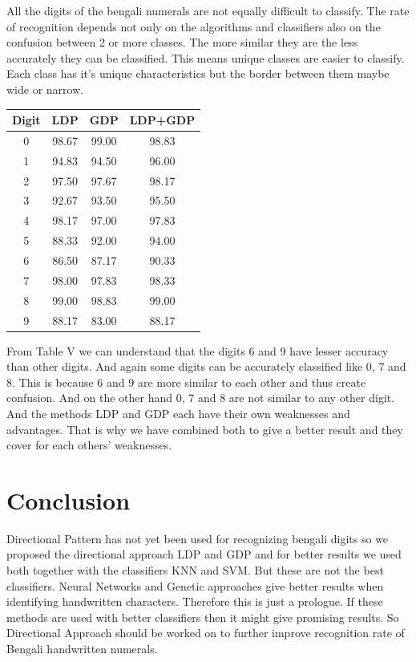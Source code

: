 \documentclass[conference]{IEEEtran}
\begin{document}
All the digits of the bengali numerals are not equally difficult to classify. The rate of recognition depends not only on the algorithms and classifiers also on the confusion between 2 or more classes. The more similar they are the less accurately they can be classified. This means unique classes are easier to classify. Each class has it's unique characteristics but the border between them maybe wide or narrow.
\begin{center}
	\begin{tabular}{cccc}
		\hline
		Digit & LDP & GDP & LDP+GDP \\
		\hline
		0 & 98.67 & 99.00 & 98.83\\
		1 & 94.83 & 94.50 & 96.00\\
		2 & 97.50 & 97.67 & 98.17\\
		3 & 92.67 & 93.50 & 95.50\\
		4 & 98.17 & 97.00 & 97.83\\
		5 & 88.33 & 92.00 & 94.00\\
		6 & 86.50 & 87.17 & 90.33\\
		7 & 98.00 & 97.83 & 98.33\\
		8 & 99.00 & 98.83 & 99.00\\
		9 & 88.17 & 83.00 & 88.17\\
		\hline
	\end{tabular}
\end{center}
From Table V we can understand that the digits 6 and 9 have lesser accuracy than other digits. And again some digits can be accurately classified like 0, 7 and 8. This is because 6 and 9 are more similar to each other and thus create confusion. And on the other hand 0, 7 and 8 are not similar to any other digit. And the methods LDP and GDP each have their own weaknesses and advantages. That is why we have combined both to give a better result and they cover for each others' weaknesses.


\section{Conclusion}
Directional Pattern has not yet been used for recognizing bengali digits so we proposed the directional approach LDP and GDP and for better results we used both together with the classifiers KNN and SVM.  But these are not the best classifiers. Neural Networks and Genetic approaches give better results when identifying handwritten characters. Therefore this is just a prologue. If these methods are used with better classifiers then it might give promising results. So Directional Approach should be worked on to further improve recognition rate of Bengali handwritten numerals.
\end{document}
